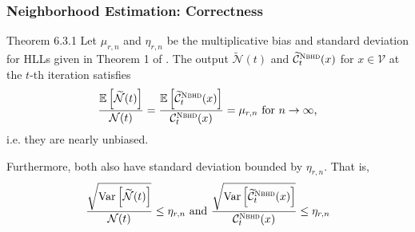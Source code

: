 \documentclass{beamer}
\newcommand{\algoname}[1]{\textnormal{\textsc{#1}}}
\newcommand{\E}{\mathbb{E}}
\newcommand{\Var}{\textnormal{Var}}
\begin{document}
\begin{frame}[label = query]
\begin{block}{}
\begin{center}
\end{center}
\end{block}

\end{frame}


\begin{frame}
\frametitle{Neighborhood Estimation: Correctness}

\begin{block}{Theorem 6.3.1}
Let $\mu_{r, n}$ and $\eta_{r, n}$ be the multiplicative bias and standard deviation for \algoname{HLL}s given in Theorem 1 of \cite{flajolet2007hyperloglog}.
The output $\widetilde{\mathcal{N}}(t)$ and $\widetilde{\mathcal{C}}^{\algoname{Nbhd}}_t(x)$ for $x \in \mathcal{V}$ at the $t$-th iteration satisfies 
%
\begin{equation*}
	\frac{\E \left [ \widetilde{\mathcal{N}}(t) \right ]}{\mathcal{N}(t)} 
	= \frac{\E \left [ \widetilde{\mathcal{C}}^{\algoname{Nbhd}}_t(x) \right ]}{\mathcal{C}^{\algoname{Nbhd}}_t(x)} 
	= \mu_{r, n} 
	\textnormal{ for $n \rightarrow \infty$,}
\end{equation*}
%
i.e. they are nearly unbiased.

Furthermore, both also have standard deviation bounded by $\eta_{r,n}$.
That is, 
%
\begin{equation*}
	\frac{\sqrt{\Var \left [ \widetilde{\mathcal{N}}(t)\right ]}}{\mathcal{N}(t)} \leq \eta_{r, n}
	\textnormal{ and }
	\frac{\sqrt{\Var \left [ \widetilde{\mathcal{C}}^{\algoname{Nbhd}}_t(x) \right ]}}{\mathcal{C}^{\algoname{Nbhd}}_t(x)} \leq \eta_{r, n}
\end{equation*}
%
\end{block}

\end{frame}
\end{document}
